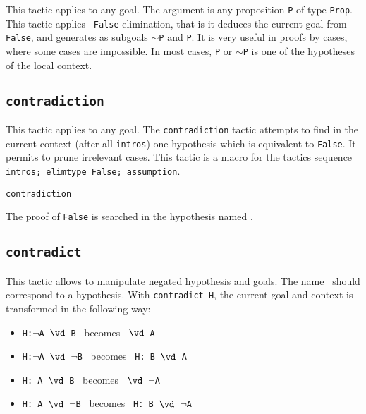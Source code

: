 This tactic applies to any goal. The argument {\term} is any
proposition {\tt P} of type {\tt Prop}. This tactic applies {\tt
  False} elimination, that is it deduces the current goal from {\tt
  False}, and generates as subgoals {\tt $\sim$P} and {\tt P}. It is
very useful in proofs by cases, where some cases are impossible. In
most cases, \texttt{P} or $\sim$\texttt{P} is one of the hypotheses of
the local context.

\subsection{\tt contradiction
\label{contradiction}
}

This tactic applies to any goal. The {\tt contradiction} tactic
attempts to find in the current context (after all {\tt intros}) one
hypothesis which is equivalent to {\tt False}. It permits to prune 
irrelevant cases. This tactic is a macro for the tactics sequence 
{\tt intros; elimtype False; assumption}. 

\begin{ErrMsgs}
\item {}
\end{ErrMsgs}

\begin{Variants}
\item {\tt contradiction \ident}

The proof of {\tt False} is searched in the hypothesis named \ident.
\end{Variants}

\subsection {\tt contradict \ident}
\label{contradict}

This tactic allows to manipulate negated hypothesis and goals. The
name \ident\ should correspond to a hypothesis. With 
{\tt contradict H}, the current goal and context is transformed in
the following way: 
\begin{itemize}
\item  {\tt H:$\neg$A $\vd$  B} \ becomes \ {\tt $\vd$ A}
\item  {\tt H:$\neg$A $\vd$ $\neg$B} \  becomes \ {\tt H: B $\vd$  A }
\item  {\tt H: A $\vd$  B} \ becomes \ {\tt $\vd$ $\neg$A}
\item  {\tt H: A $\vd$ $\neg$B} \ becomes \ {\tt H: B $\vd$ $\neg$A}
\end{itemize}

